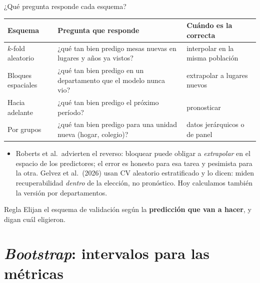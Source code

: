\documentclass{beamer}
\newcommand{\1}{\mathbb{I}}
\begin{document}
\begin{frame}{¿Qué pregunta responde cada esquema?}
\small
\begin{center}
\scriptsize
\setlength{\tabcolsep}{4pt}
\renewcommand{\arraystretch}{1.2}
\begin{tabular}{lp{5.2cm}p{3.6cm}}
\hline
Esquema & Pregunta que responde & Cuándo es la correcta \\
\hline
$k$-fold aleatorio & ¿qué tan bien predigo mesas nuevas en lugares y años ya vistos? & interpolar en la misma población \\
Bloques espaciales & ¿qué tan bien predigo en un departamento que el modelo nunca vio? & extrapolar a lugares nuevos \\
Hacia adelante & ¿qué tan bien predigo el próximo período? & pronosticar \\
Por grupos & ¿qué tan bien predigo para una unidad nueva (hogar, colegio)? & datos jerárquicos o de panel \\
\hline
\end{tabular}
\end{center}
\pause
\begin{itemize}\itemsep3pt
  \item Roberts et al.\ advierten el reverso: bloquear puede obligar a \emph{extrapolar} en el espacio de los predictores; el error es honesto para esa tarea y pesimista para la otra. Gelvez et al.\ (2026) usan CV aleatorio estratificado y lo dicen: miden recuperabilidad \emph{dentro} de la elección, no pronóstico. Hoy calculamos también la versión por departamentos.
\end{itemize}
\pause
\begin{block}{Regla}
Elijan el esquema de validación según la \textbf{predicción que van a hacer}, y digan cuál eligieron.
\end{block}
\end{frame}


\section{\emph{Bootstrap}: intervalos para las métricas}
\begin{frame}[noframenumbering]
\tableofcontents[currentsection]
\end{frame}
\end{document}
